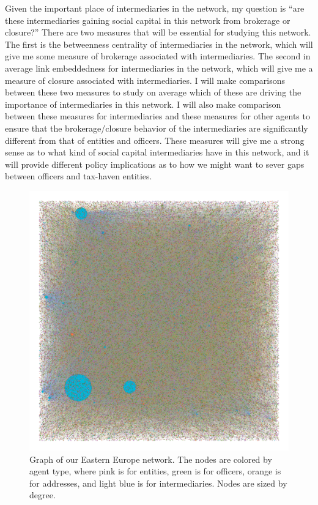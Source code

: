 \documentclass[11pt]{article}
\begin{document}
Given the important place of intermediaries in the network, my question is
``are these intermediaries gaining social capital in this
network from brokerage or closure?'' There are two measures that will be
essential for studying this network. The first is the betweenness centrality
of intermediaries in the network, which will give me some measure of
brokerage associated with intermediaries. The second in average link
embeddedness for intermediaries in the network, which will give me a measure
of closure associated with intermediaries. I will make comparisons between these
two measures to study on average which of these are driving the importance of
intermediaries in this network. I will also make comparison between these
measures for intermediaries and these measures for other agents to ensure that
the brokerage/closure behavior of the intermediaries are significantly
different from that of entities and officers. These measures will give me a
strong sense as to what kind of social capital intermediaries have in this
network, and it will provide different policy implications as to how we might
want to sever gaps between officers and tax-haven entities.

\begin{figure}[h!]
    \centering
    \includegraphics[width = 5in]{../analysis/figures/easternEuropeNetwork.png}
    \caption{Graph of our Eastern Europe network. The nodes are colored by
        agent type, where pink is for entities, green is for officers,
        orange is for addresses, and light blue is for intermediaries. Nodes
        are sized by degree.}
\end{figure}
\end{document}
